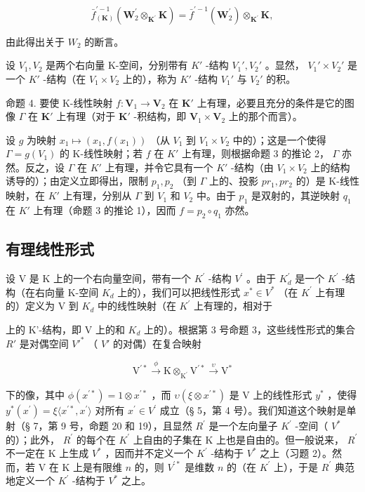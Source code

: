 \[
\bar {f} _ {(\mathbf {K})} ^ {\prime - 1} (\mathbf {W} _ {2} ^ {\prime} \otimes_ {\mathbf {K} ^ {\prime}} \mathbf {K}) = \bar {f} ^ {\prime - 1} (\mathbf {W} _ {2} ^ {\prime}) \otimes_ {\mathbf {K} ^ {\prime}} \mathbf {K},
\]

由此得出关于 \(W_{2}\) 的断言。

设 \(V_{1}, V_{2}\) 是两个右向量 K-空间，分别带有 \(K'\) -结构 \(V_{1}', V_{2}'\) 。显然， \(V_{1}' \times V_{2}'\) 是一个 \(K'\) -结构（在 \(V_{1} \times V_{2}\) 上的），称为 \(K'\) -结构 \(V_{1}'\) 与 \(V_{2}'\) 的积。

命题 4. 要使 K-线性映射 \(f: \mathbf{V}_1 \to \mathbf{V}_2\) 在 \(\mathbf{K}'\) 上有理，必要且充分的条件是它的图像 \(\Gamma\) 在 \(\mathbf{K}'\) 上有理（对于 \(\mathbf{K}'\) -积结构，即 \(\mathbf{V}_1 \times \mathbf{V}_2\) 上的那个而言）。

设 \(g\) 为映射 \(x_1 \mapsto (x_1, f(x_1))\) （从 \(V_1\) 到 \(V_1 \times V_2\) 中的）；这是一个使得 \(\Gamma = g(V_1)\) 的 K-线性映射；若 \(f\) 在 \(K'\) 上有理，则根据命题 3 的推论 2， \(\Gamma\) 亦然。反之，设 \(\Gamma\) 在 \(K'\) 上有理，并令它具有一个 \(K'\) -结构（由 \(V_1 \times V_2\) 上的结构诱导的）；由定义立即得出，限制 \(p_1, p_2\) （到 \(\Gamma\) 上的、投影 \(pr_1, pr_2\) 的）是 K-线性映射，在 \(K'\) 上有理，分别从 \(\Gamma\) 到 \(V_1\) 和 \(V_2\) 中。由于 \(p_1\) 是双射的，其逆映射 \(q_1\) 在 \(K'\) 上有理（命题 3 的推论 1），因而 \(f = p_2 \circ q_1\) 亦然。

\subsection{有理线性形式}

设 V 是 K 上的一个右向量空间，带有一个 \(K^{\prime}\) -结构 \(V^{\prime}\) 。由于 \(K_{d}^{\prime}\) 是一个 \(K^{\prime}\) -结构（在右向量 K-空间 \(K_{d}\) 上的），我们可以把线性形式 \(x^{*} \in V^{*}\) （在 \(K^{\prime}\) 上有理的）定义为 V 到 \(K_{d}\) 中的线性映射（在 \(K^{\prime}\) 上有理的，相对于

上的 K'-结构，即 V 上的和 \(K_{d}\) 上的）。根据第 3 号命题 3，这些线性形式的集合 \(R'\) 是对偶空间 \(V'^*\) （ \(V'\) 的对偶）在复合映射

\[
\mathrm{V} ^ {\prime *} \xrightarrow {\phi} \mathrm{K} \otimes_ {\mathrm{K} ^ {\prime}} \mathrm{V} ^ {\prime *} \xrightarrow {\upsilon} \mathrm{V} ^ {*}\tag{1}
\]

下的像，其中 \(\phi(x^{\prime*}) = 1 \otimes x^{\prime*}\) ，而 \(\upsilon(\xi \otimes x^{\prime*})\) 是 V 上的线性形式 \(y^{*}\) ，使得 \(y^{*}(x^{\prime}) = \xi\langle x^{\prime*}, x^{\prime} \rangle\) 对所有 \(x^{\prime} \in V^{\prime}\) 成立（§ 5，第 4 号）。我们知道这个映射是单射（§ 7，第 9 号，命题 20 和 19），且显然 \(R^{\prime}\) 是一个左向量子 \(K^{\prime}\) -空间（ \(V^{*}\) 的）；此外， \(R^{\prime}\) 的每个在 \(K^{\prime}\) 上自由的子集在 K 上也是自由的。但一般说来， \(R^{\prime}\) 不一定在 K 上生成 \(V^{*}\) ，因而并不定义一个 \(K^{\prime}\) -结构于 \(V^{*}\) 之上（习题 2）。然而，若 V 在 K 上是有限维 \(n\) 的，则 \(V^{\prime*}\) 是维数 \(n\) 的（在 \(K^{\prime}\) 上），于是 \(R^{\prime}\) 典范地定义一个 \(K^{\prime}\) -结构于 \(V^{*}\) 之上。

